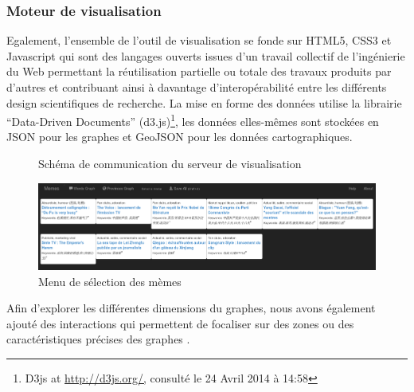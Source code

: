 
\subsubsection{Moteur de visualisation} %
\label{ssub:moteur_de_visualisation}

Egalement, l{\textquoteright}ensemble de l{\textquoteright}outil de visualisation se fonde sur HTML5, CSS3 et Javascript qui sont des langages ouverts issues d{\textquoteright}un travail collectif de l{\textquoteright}ingénierie du Web permettant la réutilisation partielle ou totale des travaux produits par d{\textquoteright}autres et contribuant ainsi à davantage d{\textquoteright}interopérabilité entre les différents design scientifiques de recherche. La mise en forme des données utilise la librairie {\textquotedblleft}Data-Driven Documents{\textquotedblright} (d3.js)\footnote{ D3js at \url{http://d3js.org/,} consulté le 24 Avril 2014 à 14:58}, les données elles-mêmes sont stockées en JSON pour les graphes et GeoJSON pour les données cartographiques. 

\begin{figure}
    \label{fig:ui-graph}
    \centering
    \caption{Schéma de communication du serveur de visualisation}
\end{figure}


\begin{figure}
    \label{fig:ui-menu}
    \centering
    \includegraphics[scale=0.3]{figures/chap4/ui/ui-menu.png}
    \caption{Menu de sélection des mèmes}
\end{figure}



Afin d{\textquoteright}explorer les différentes dimensions du graphes, nous avons également ajouté des interactions qui permettent de focaliser sur des zones ou des caractéristiques précises des graphes \citep{Bostock2011}.

